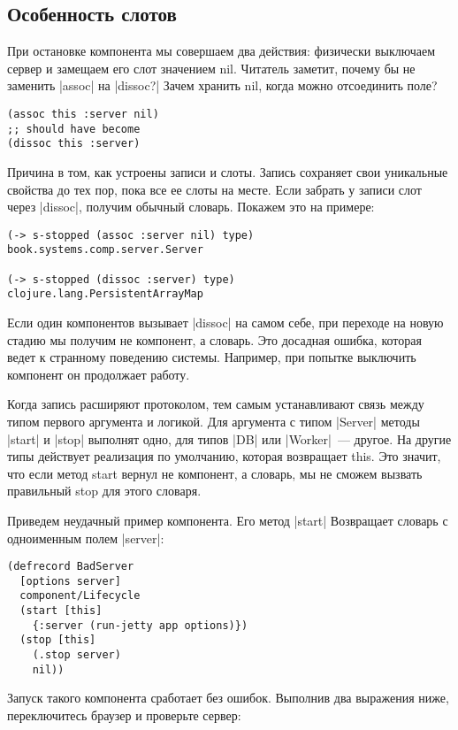 \subsection{Особенность слотов}

При остановке компонента мы совершаем два действия: физически выключаем сервер и
замещаем его слот значением nil. Читатель заметит, почему бы не заменить \spverb|assoc|
на \spverb|dissoc?| Зачем хранить nil, когда можно отсоединить поле?

\begin{verbatim}
(assoc this :server nil)
;; should have become
(dissoc this :server)
\end{verbatim}

Причина в том, как устроены записи и слоты. Запись сохраняет свои уникальные
свойства до тех пор, пока все ее слоты на месте. Если забрать у записи слот
через \spverb|dissoc|, получим обычный словарь. Покажем это на примере:

\begin{verbatim}
(-> s-stopped (assoc :server nil) type)
book.systems.comp.server.Server

(-> s-stopped (dissoc :server) type)
clojure.lang.PersistentArrayMap
\end{verbatim}

Если один компонентов вызывает \spverb|dissoc| на самом себе, при переходе на новую
стадию мы получим не компонент, а словарь. Это досадная ошибка, которая ведет к
странному поведению системы. Например, при попытке выключить компонент он
продолжает работу.

Когда запись расширяют протоколом, тем самым устанавливают связь между типом
первого аргумента и логикой. Для аргумента с типом \spverb|Server| методы \spverb|start| и
\spverb|stop| выполнят одно, для типов \spverb|DB| или \spverb|Worker|~--- другое. На другие типы
действует реализация по умолчанию, которая возвращает this. Это значит, что если
метод start вернул не компонент, а словарь, мы не сможем вызвать правильный stop
для этого словаря.

Приведем неудачный пример компонента. Его метод \spverb|start| Возвращает словарь с
одноименным полем \spverb|server|:

\begin{verbatim}
(defrecord BadServer
  [options server]
  component/Lifecycle
  (start [this]
    {:server (run-jetty app options)})
  (stop [this]
    (.stop server)
    nil))
\end{verbatim}

Запуск такого компонента сработает без ошибок. Выполнив два выражения ниже,
переключитесь браузер и проверьте сервер:

